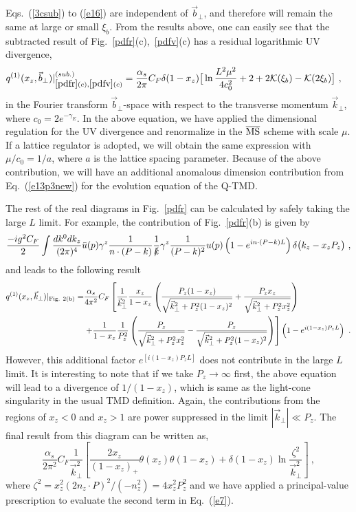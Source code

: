 \documentclass[aps,prd,preprint,tightenlines,superscriptaddress,nofootinbib]{revtex4}
\begin{document}
Eqs.~(\ref{3csub}) to (\ref{e16}) are independent of ${\vec b}_\perp$, and therefore will remain the same at large or small $\xi_b$. From the results above, one can easily see that the 
subtracted result of Fig.~\ref{pdfr}(c),~\ref{pdfv}(c) has a residual logarithmic UV divergence, 
\begin{align}
q^{(1)}(x_z,{\vec b}_\perp)|_{\ref{pdfr}(c),\ref{pdfv}(c)}^{(sub.)}&=\frac{\alpha_s}{2\pi}
C_F\delta(1-x_z)\big[\ln\frac{L^2\mu^2}{4c_0^2}+2+2{\cal K}(\xi_b)-{\cal K}(2\xi_b)\big] \ ,\label{e13p3new}
\end{align}
in the Fourier transform ${\vec b}_\perp$-space with respect to the transverse momentum 
${\vec k}_\perp$, where $c_0=2e^{-\gamma_E}$. In the above equation, 
we have applied the dimensional regulation for the UV divergence
and renormalize in the $\overline{\rm MS}$ scheme with scale $\mu$. If a lattice regulator is adopted, we will
obtain the same expression with $\mu/c_0=1/a$, where $a$ is the lattice 
spacing parameter. Because of the above contribution, we will have an additional anomalous
dimension contribution from Eq.~(\ref{e13p3new}) for the evolution 
equation of the Q-TMD. 

The rest of the real diagrams in Fig.~\ref{pdfr} can be calculated by 
safely taking the large $L$ limit. For example, the contribution of 
Fig.~\ref{pdfr}(b) is given by
\begin{align}
\frac {-i g^2 C_F}{2}\int\frac{dk^0 dk_z}{(2\pi)^4}\bar u(p)\gamma^z \frac{1}{n\cdot(P-k)}\frac{1}{\slashed k}\gamma^z\frac{1}{(P-k)^2} u(p)
\left(1-e^{ in\cdot(P-k)L}\right)\delta\big(k_z-x_z P_z\big)\ ,
\end{align}
and leads to the following result
\begin{align}
q^{(1)}(x_z,{\vec k}_\perp)|_{\rm Fig.~2(b)}=&\frac{\alpha_s}{4\pi^2}C_F\left[\frac{1}{{\vec k}_\perp^2}\frac{x_z}{1-x_z}\left(\frac{P_z(1-x_z)}{\sqrt{{\vec k}_\perp^2+P_z^2(1-x_z)^2}} + \frac{P_zx_z}{\sqrt{{\vec k}_\perp^2+P_z^2x_z^2}}\right)\right.\nonumber\\
&\left.+{1\over 1-x_z}{1\over P_z^2}\left({P_z\over \sqrt{{\vec k}_\perp^2 + P_z^2x_z^2}}-{P_z\over \sqrt{{\vec k}_\perp^2 + P_z^2(1-x_z)^2}}\right)\right]\left(1-e^{ i(1-x_z)P_zL}\right) \ . \label{e6}
\end{align}
However, this additional factor $e^{[i(1-x_z)P_zL]}$ does not
contribute in the large $L$ limit.  
It is interesting to note that if we take $P_z\to \infty$ first, the above
equation will lead to a divergence of $1/(1-x_z)$, which is same as the 
light-cone singularity in the usual TMD definition. 
Again, the contributions from the regions of $x_z<0$ and $x_z>1$ are power suppressed in the limit
 $|{\vec k}_\perp|\ll P_z$. The final result from this diagram can be written as, 
\begin{equation}
\frac{\alpha_s}{2\pi^2}C_F\frac{1}{{\vec k}_\perp^2}\left[\frac{2x_z}{(1-x_z)_+}\theta(x_z)\theta(1-x_z)+\delta(1-x_z)\ln\frac{\zeta^2}{{\vec k}_\perp^2}\right] \ ,\label{e7}
\end{equation}
where $\zeta^2=x_z^2(2n_z\cdot P)^2/(-n_z^2)=4x_z^2P_z^2$ and we have applied a 
principal-value prescription to evaluate the second term in Eq.~(\ref{e7}).
\end{document}
